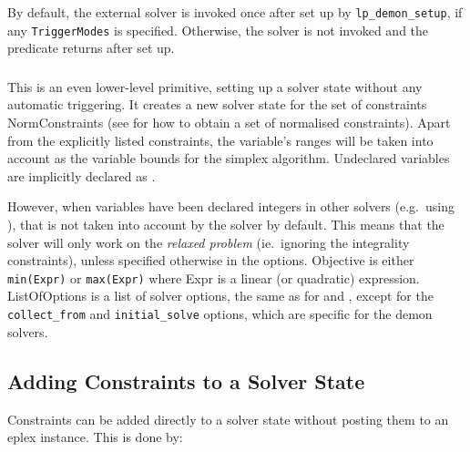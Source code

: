 By default, the external solver is invoked once after set up
by {\tt lp_demon_setup},
if any {\tt TriggerModes} is specified. Otherwise, the solver is not
invoked and the predicate returns after set up.


\subsubsection{}
\label{lpsetup}
This is an even lower-level primitive, setting up a solver state
without any automatic triggering.
It creates a new solver state for the set of constraints NormConstraints
(see  for how to obtain a set of
normalised constraints).
Apart from the explicitly listed constraints, the variable's ranges will
be taken into account as the variable bounds for the simplex algorithm.
Undeclared variables are implicitly declared as .

However, when variables have been declared integers in other solvers (e.g.\
using ),
that is not taken into account by the solver by default.
This means that the solver will only work on the {\em relaxed problem}
(ie.\ ignoring the integrality constraints),
unless specified otherwise in the options.
Objective is either {\tt min(Expr)} or {\tt max(Expr)}
where Expr is a linear (or quadratic) expression.
ListOfOptions is a list of solver options, the same as for
 and , except for the {\tt
  collect_from} and {\tt initial_solve} options, which are specific for the
demon solvers.

\subsection{Adding Constraints to a Solver State}

Constraints can be added directly to a solver state without posting them to
an eplex instance. This is done by:

\subsubsection{}

